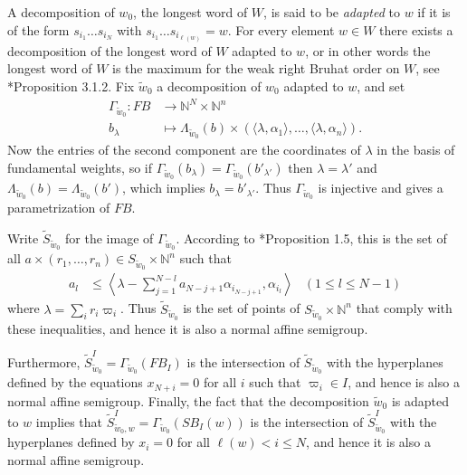 \documentclass[11pt,fleqn]{article}
\newcommand\NN{\mathbb N}
\renewcommand\to{\longrightarrow}
\newcommand\flagbasis{FB}
\newcommand\schubertbasis{SB}
\begin{document}
A decomposition of $w_0$, the longest word of $W$, is said to be \emph{adapted}
to $w$ if it is of the form $s_{i_1} \ldots s_{i_N}$ with $s_{i_1} \ldots 
s_{i_{\ell(w)}} = w$. For every element $w \in W$ there exists a decomposition 
of the longest word of $W$ adapted to $w$, or in other words the longest word 
of $W$ is the maximum for the weak right Bruhat order on $W$, see 
\cite{BB}*{Proposition 3.1.2}. Fix $\tilde w_0$ a decomposition of $w_0$ 
adapted to $w$, and set
\begin{align*}
\Gamma_{\tilde w_0}:
   FB &\to \NN^{N} \times \NN^n \\
   b_\lambda & \longmapsto \Lambda_{\tilde w_0}(b) \times 
   (\langle \lambda, \alpha_1 \rangle, \ldots, \langle \lambda, \alpha_n 
   \rangle).
\end{align*}
Now the entries of the second component are the coordinates of $\lambda$ in 
the basis of fundamental weights, so if $\Gamma_{\tilde w_0}(b_\lambda) = 
\Gamma_{\tilde w_0}(b'_{\lambda'})$ then $\lambda = \lambda'$ and 
$\Lambda_{\tilde w_0}(b) = \Lambda_{\tilde w_0}(b')$, which implies 
$b_\lambda = b'_{\lambda'}$. Thus $\Gamma_{\tilde w_0}$ is injective and gives 
a parametrization of $\flagbasis$. 

Write $\tilde S_{\tilde w_0}$ for the image of $\Gamma_{\tilde w_0}$. 
According to \cite{Lit}*{Proposition 1.5}, this is the set of all 
$a \times (r_1, \ldots, r_n) \in S_{\tilde w_0} \times \NN^n$ such that
\begin{align*}
a_l 
  &\leq \left\langle \lambda - \sum_{j=1}^{N-l} a_{N-j+1} \alpha_{i_{N-j+1}}, 
  \alpha_{i_l} \right\rangle
& (1 \leq l \leq N-1)
\end{align*}
where $\lambda = \sum_i r_i \varpi_i$. Thus $\tilde S_{\tilde w_0}$ is the set 
of points of $S_{\tilde w_0} \times \NN^n$ that comply with these 
inequalities, and hence it is also a normal affine semigroup. 

Furthermore, $\tilde S_{\tilde w_0}^I = \Gamma_{\tilde w_0}(\flagbasis_I)$ is 
the intersection of $\tilde S_{\tilde w_0}$ with the hyperplanes defined by 
the equations $x_{N+i} = 0$ for all $i$ such that $\varpi_i \in I$, and hence 
is also a normal affine semigroup. Finally, the fact that the decomposition 
$\tilde w_0$ is adapted to $w$ implies that 
$\tilde S_{\tilde w_0, w}^I = \Gamma_{\tilde w_0}(\schubertbasis_I(w))$ is the 
intersection of $\tilde S_{\tilde w_0}^I$ with the hyperplanes defined by 
$x_i = 0$ for all $\ell(w) < i \leq N$, and hence it is also a normal affine 
semigroup. 
\end{document}
